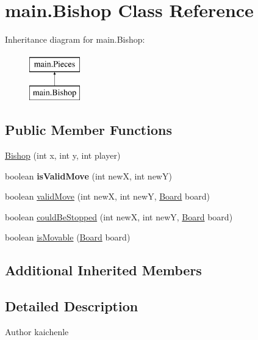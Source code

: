 \hypertarget{classmain_1_1_bishop}{}\section{main.\+Bishop Class Reference}
\label{classmain_1_1_bishop}
Inheritance diagram for main.\+Bishop\+:\begin{figure}[H]
\begin{center}
\leavevmode
\includegraphics[height=2.000000cm]{classmain_1_1_bishop}
\end{center}
\end{figure}
\subsection*{Public Member Functions}
\begin{DoxyCompactItemize}
\item 
\mbox{\hyperlink{classmain_1_1_bishop_a7bd138f6235b21e03abd144019550dca}{Bishop}} (int x, int y, int player)
\item 
\mbox{\label{classmain_1_1_bishop_a94831e04973f57ce029300fa886c3f9d}} 
boolean {\bfseries is\+Valid\+Move} (int newX, int newY)
\item 
boolean \mbox{\hyperlink{classmain_1_1_bishop_a8690770e84015412d261577a0a30dadd}{valid\+Move}} (int newX, int newY, \mbox{\hyperlink{classmain_1_1_board}{Board}} board)
\item 
boolean \mbox{\hyperlink{classmain_1_1_bishop_a669732f2463b39beba91497d5345d48b}{could\+Be\+Stopped}} (int newX, int newY, \mbox{\hyperlink{classmain_1_1_board}{Board}} board)
\item 
boolean \mbox{\hyperlink{classmain_1_1_bishop_a8fa8870068eaa19b494949ac7b62f7c7}{is\+Movable}} (\mbox{\hyperlink{classmain_1_1_board}{Board}} board)
\end{DoxyCompactItemize}
\subsection*{Additional Inherited Members}


\subsection{Detailed Description}
\begin{DoxyAuthor}{Author}
kaichenle 
\end{DoxyAuthor}


